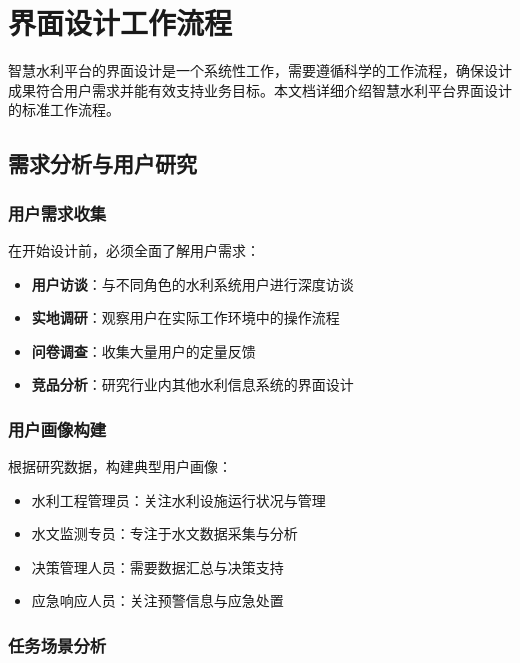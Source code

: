 \section{界面设计工作流程}\label{ux754cux9762ux8bbeux8ba1ux5de5ux4f5cux6d41ux7a0b}

智慧水利平台的界面设计是一个系统性工作，需要遵循科学的工作流程，确保设计成果符合用户需求并能有效支持业务目标。本文档详细介绍智慧水利平台界面设计的标准工作流程。

\subsection{需求分析与用户研究}\label{ux9700ux6c42ux5206ux6790ux4e0eux7528ux6237ux7814ux7a76}

\subsubsection{用户需求收集}\label{ux7528ux6237ux9700ux6c42ux6536ux96c6}

在开始设计前，必须全面了解用户需求：

\begin{itemize}
\tightlist
\item
  \textbf{用户访谈}：与不同角色的水利系统用户进行深度访谈
\item
  \textbf{实地调研}：观察用户在实际工作环境中的操作流程
\item
  \textbf{问卷调查}：收集大量用户的定量反馈
\item
  \textbf{竞品分析}：研究行业内其他水利信息系统的界面设计
\end{itemize}

\subsubsection{用户画像构建}\label{ux7528ux6237ux753bux50cfux6784ux5efa}

根据研究数据，构建典型用户画像：

\begin{itemize}
\tightlist
\item
  水利工程管理员：关注水利设施运行状况与管理
\item
  水文监测专员：专注于水文数据采集与分析
\item
  决策管理人员：需要数据汇总与决策支持
\item
  应急响应人员：关注预警信息与应急处置
\end{itemize}

\subsubsection{任务场景分析}\label{ux4efbux52a1ux573aux666fux5206ux6790}

